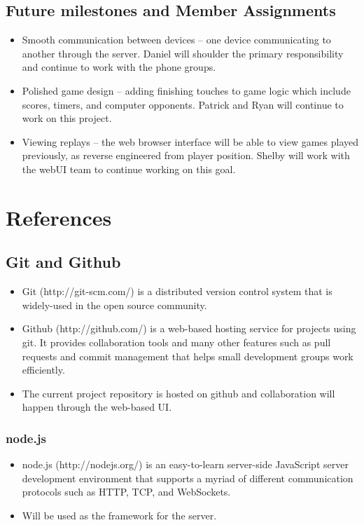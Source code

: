 \documentclass[letterpaper,12pt]{article}
\begin{document}
\subsection{Future milestones and Member Assignments}
\begin{itemize}
	\item Smooth communication between devices -- one device communicating to another through the server. Daniel will shoulder the primary responsibility and continue to work with the phone groups.
	\item Polished game design -- adding finishing touches to game logic which include scores, timers, and computer opponents. Patrick and Ryan will continue to work on this project. 
	\item Viewing replays -- the web browser interface will be able to view games played previously, as reverse engineered from player position. Shelby will work with the webUI team to continue working on this goal.
\end{itemize}

\section{References}
\subsection{Git and Github}
	\begin{itemize}
		\item Git (http://git-scm.com/) is a distributed version control system that is widely-used in the open source community.
		\item Github (http://github.com/) is a web-based hosting service for projects using git. It provides collaboration tools and many other features such as pull requests and commit management that helps small development groups work efficiently.
		\item The current project repository is hosted on github and collaboration will happen through the web-based UI.
	\end{itemize}
\subsubsection{node.js}
	\begin{itemize}
		\item node.js (http://nodejs.org/) is an easy-to-learn server-side JavaScript server development environment that supports a myriad of different communication protocols such as HTTP, TCP, and WebSockets.
		\item Will be used as the framework for the server.
	\end{itemize}
\end{document}
